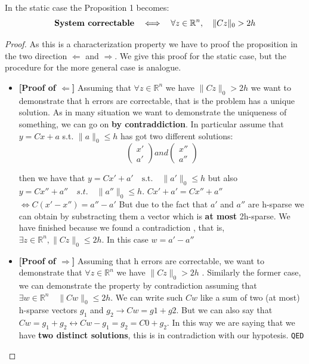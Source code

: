 \noindent
In the static case the Proposition 1 becomes: $$\textrm{\textbf{System correctable}} \quad \Longleftrightarrow \quad \forall z \in \mathbb{R}^n , \quad \lVert Cz \rVert_0>2h$$
\begin{proof}
    As this is a characterization property we have to proof the proposition in the two direction $\Leftarrow$ and $\Rightarrow$. We give this proof for the static case, but the procedure for the more general case is analogue.
    \begin{itemize}
        \item {\Large{\textbf{[Proof of $\Leftarrow$] }}}
        {\color{blue} Assuming that 
        $\forall z \in \mathbb{R}^n$ we have $\lVert Cz \rVert_0 > 2h $ we want to demonstrate that h errors are correctable}, that is the problem has a unique solution.  As in many situation we want to demonstrate the uniqueness of something, we can go on \textbf{by contraddiction}. In particular assume that $y=Cx+a$ s.t. $\lVert a \rVert_0 \le h$ has got two different solutions: 
        $$\begin{pmatrix}
            x'\\ a'
        \end{pmatrix} and \begin{pmatrix}
            x''\\a''
        \end{pmatrix}$$

        then we have that $y=Cx'+a' \quad \textrm{s.t.} \quad \lVert a' \rVert_0 \le h$ but also $y=Cx''+a'' \quad s.t. \quad \lVert a'' \rVert_0 \le h $. $Cx'+a'=Cx''+a''$ $\Longleftrightarrow C(x'-x'')=a''-a'$ But due to the fact that $a'$ and $a''$ are h-sparse we can obtain by substracting them a vector which is \textbf{at most} 2h-sparse. 
        We have finished because we found a contradiction , that is, $\exists  z \in \mathbb{R}^n, \lVert Cz \rVert_0 \le 2h$. In this case $w=a'-a''$
        
        \item {\Large{\textbf{[Proof of $\Rightarrow$] }}}{\color{blue} Assuming that h errors are correctable,  we want to demonstrate that 
        $\forall z \in \mathbb{R}^n$ we have $\lVert Cz \rVert_0 > 2h $ }. Similarly the former case,  we can demonstrate the property by contradiction assuming that $\exists w \in \mathbb{R}^n \quad \lVert Cw \rVert_0 \le 2h$. We can write such $Cw$ like a sum of two (at most) h-sparse vectors $g_1$ and $g_2 \rightarrow Cw=g1+g2$. But we can also say that $Cw=g_1+g_2 \longleftrightarrow Cw-g_1=g_2=C 0+g_2 $. In this way we are saying that we have \textbf{two distinct solutions}, this is in contradiction with our hypotesis. \texttt{QED}
    \end{itemize}
\end{proof}

